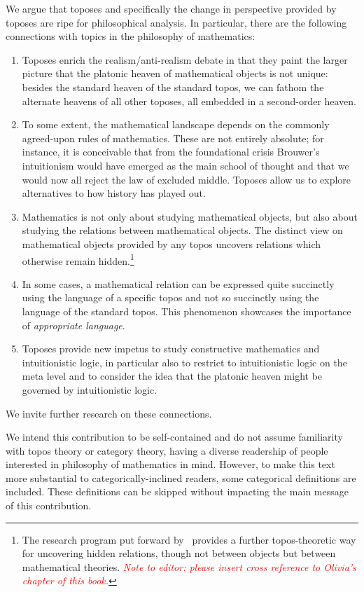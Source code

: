 \documentclass[graybox]{svmult}
\renewcommand{\_}{\mathpunct{.}\,}
\newcommand{\?}{\,{:}\,}
\begin{document}
We argue that toposes and specifically the change in perspective provided by
toposes are ripe for philosophical analysis. In particular, there are the
following connections with topics in the philosophy of mathematics:
\begin{enumerate}
\item Toposes enrich the realism/anti-realism debate in that they paint the larger
picture that the platonic heaven of mathematical objects is not unique: besides
the standard heaven of the standard topos, we can fathom the alternate
heavens of all other toposes, all embedded in a second-order heaven.
\item To some extent, the mathematical landscape depends on the commonly agreed-upon rules of
mathematics. These are not entirely absolute; for instance, it is conceivable
that from the foundational crisis Brouwer's intuitionism would have emerged as
the main school of thought and that we would now all reject the law of excluded
middle. Toposes allow us to explore alternatives to how history
has played out.
\item Mathematics is not only about studying mathematical objects, but also
about studying the relations between mathematical objects. The distinct view
on mathematical objects provided by any topos uncovers relations which
otherwise remain hidden.\footnote{The research
program put forward by~\cite{caramello:tst} provides a further topos-theoretic way for
uncovering hidden relations, though not between objects but between mathematical
theories. \textit{\textcolor{red}{Note to editor: please insert cross reference to Olivia's chapter of
this book.}}}
\item In some cases, a mathematical relation can be expressed quite succinctly
using the language of a specific topos and not so succinctly using the language
of the standard topos. This phenomenon showcases the importance of
\emph{appropriate language}.
\item Toposes provide new impetus to study constructive mathematics and
intuitionistic logic, in particular also to restrict to intuitionistic
logic on the meta level and to consider the idea that the platonic heaven might
be governed by intuitionistic logic.
\end{enumerate}
We invite further research on these connections.

We intend this contribution to be self-contained and do not assume familiarity with
topos theory or category theory, having a diverse readership of people interested in philosophy of
mathematics in mind. However, to make this text more substantial to
categorically-inclined readers, some categorical definitions are included.
These definitions can be skipped without impacting the main message of this contribution.
\end{document}
